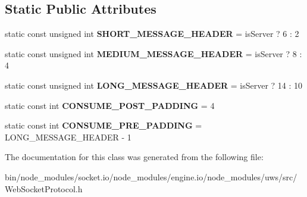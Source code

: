 \subsection*{Static Public Attributes}
\begin{DoxyCompactItemize}
\item 
\mbox{\label{classu_w_s_1_1_web_socket_protocol_a1328256200e755c4b15530601fd3c006}} 
static const unsigned int {\bfseries S\+H\+O\+R\+T\+\_\+\+M\+E\+S\+S\+A\+G\+E\+\_\+\+H\+E\+A\+D\+ER} = is\+Server ? 6 \+: 2
\item 
\mbox{\label{classu_w_s_1_1_web_socket_protocol_ab07d1e59ca08f662b9d6d5a7ee75b2f3}} 
static const unsigned int {\bfseries M\+E\+D\+I\+U\+M\+\_\+\+M\+E\+S\+S\+A\+G\+E\+\_\+\+H\+E\+A\+D\+ER} = is\+Server ? 8 \+: 4
\item 
\mbox{\label{classu_w_s_1_1_web_socket_protocol_a1926228cac4dbda73d2f45133c90a9bd}} 
static const unsigned int {\bfseries L\+O\+N\+G\+\_\+\+M\+E\+S\+S\+A\+G\+E\+\_\+\+H\+E\+A\+D\+ER} = is\+Server ? 14 \+: 10
\item 
\mbox{\label{classu_w_s_1_1_web_socket_protocol_aa3474c509de3db9b61c90f36d8b3fbf8}} 
static const int {\bfseries C\+O\+N\+S\+U\+M\+E\+\_\+\+P\+O\+S\+T\+\_\+\+P\+A\+D\+D\+I\+NG} = 4
\item 
\mbox{\label{classu_w_s_1_1_web_socket_protocol_a832e0833581ff3d41fba8fbb3326d8c3}} 
static const int {\bfseries C\+O\+N\+S\+U\+M\+E\+\_\+\+P\+R\+E\+\_\+\+P\+A\+D\+D\+I\+NG} = L\+O\+N\+G\+\_\+\+M\+E\+S\+S\+A\+G\+E\+\_\+\+H\+E\+A\+D\+ER -\/ 1
\end{DoxyCompactItemize}


The documentation for this class was generated from the following file\+:\begin{DoxyCompactItemize}
\item 
bin/node\+\_\+modules/socket.\+io/node\+\_\+modules/engine.\+io/node\+\_\+modules/uws/src/Web\+Socket\+Protocol.\+h\end{DoxyCompactItemize}
